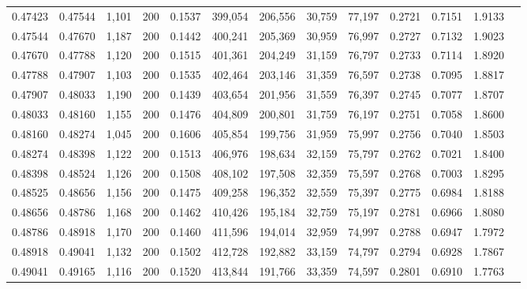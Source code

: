 \begin{tabular}{rrrrrrrrrrrrr}
0.47423 & 0.47544 &  1,101 & 200 &                                     0.1537 & 399,054 & 206,556 &  30,759 &  77,197 & 0.2721 & 0.7151 & 1.9133 \\
0.47544 & 0.47670 &  1,187 & 200 &                                     0.1442 & 400,241 & 205,369 &  30,959 &  76,997 & 0.2727 & 0.7132 & 1.9023 \\
0.47670 & 0.47788 &  1,120 & 200 &                                     0.1515 & 401,361 & 204,249 &  31,159 &  76,797 & 0.2733 & 0.7114 & 1.8920 \\
0.47788 & 0.47907 &  1,103 & 200 &                                     0.1535 & 402,464 & 203,146 &  31,359 &  76,597 & 0.2738 & 0.7095 & 1.8817 \\
0.47907 & 0.48033 &  1,190 & 200 &                                     0.1439 & 403,654 & 201,956 &  31,559 &  76,397 & 0.2745 & 0.7077 & 1.8707 \\
0.48033 & 0.48160 &  1,155 & 200 &                                     0.1476 & 404,809 & 200,801 &  31,759 &  76,197 & 0.2751 & 0.7058 & 1.8600 \\
0.48160 & 0.48274 &  1,045 & 200 &                                     0.1606 & 405,854 & 199,756 &  31,959 &  75,997 & 0.2756 & 0.7040 & 1.8503 \\
0.48274 & 0.48398 &  1,122 & 200 &                                     0.1513 & 406,976 & 198,634 &  32,159 &  75,797 & 0.2762 & 0.7021 & 1.8400 \\
0.48398 & 0.48524 &  1,126 & 200 &                                     0.1508 & 408,102 & 197,508 &  32,359 &  75,597 & 0.2768 & 0.7003 & 1.8295 \\
0.48525 & 0.48656 &  1,156 & 200 &                                     0.1475 & 409,258 & 196,352 &  32,559 &  75,397 & 0.2775 & 0.6984 & 1.8188 \\
0.48656 & 0.48786 &  1,168 & 200 &                                     0.1462 & 410,426 & 195,184 &  32,759 &  75,197 & 0.2781 & 0.6966 & 1.8080 \\
0.48786 & 0.48918 &  1,170 & 200 &                                     0.1460 & 411,596 & 194,014 &  32,959 &  74,997 & 0.2788 & 0.6947 & 1.7972 \\
0.48918 & 0.49041 &  1,132 & 200 &                                     0.1502 & 412,728 & 192,882 &  33,159 &  74,797 & 0.2794 & 0.6928 & 1.7867 \\
0.49041 & 0.49165 &  1,116 & 200 &                                     0.1520 & 413,844 & 191,766 &  33,359 &  74,597 & 0.2801 & 0.6910 & 1.7763 \\

\end{tabular}
